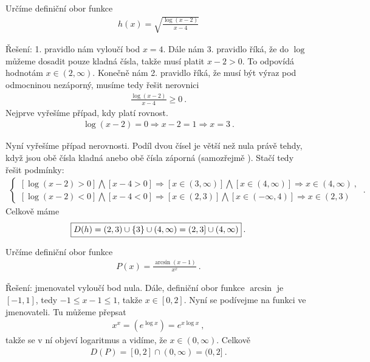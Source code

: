 \begin{example}
    Určíme definiční obor funkce \begin{align*}
        h(x) = \sqrt{ \frac{\log (x-2)}{x-4}}
    \end{align*}

    Řešení: 1. pravidlo nám vyloučí bod $x=4$. 
    Dále nám 3. pravidlo říká, že do $\log$ můžeme dosadit pouze kladná čísla, takže musí platit $x-2>0$. To odpovídá hodnotám $x \in (2, \infty)$. 
    Konečně nám 2. pravidlo říká, že musí být výraz pod odmocninou nezáporný, musíme tedy řešit nerovnici \begin{align*}
        \frac{\log (x-2)}{x-4} \geq 0 \:.
    \end{align*}
    Nejprve vyřešíme případ, kdy platí rovnost.
    \begin{align*}
        \log (x-2) = 0 \Longrightarrow x-2 = 1 \Longrightarrow x = 3 \:.
    \end{align*}
    
    Nyní vyřešíme případ nerovnosti. Podíl dvou čísel je větší než nula právě tehdy, když jsou obě čísla kladná anebo obě čísla záporná (samozřejmě ). Stačí tedy řešit podmínky:
    \begin{align*}
        \begin{cases}
            \left [\log (x-2) > 0 \right] \bigwedge \left[ x-4 > 0\right] \Longrightarrow [x \in (3,\infty)] \bigwedge [x \in (4, \infty)] \Longrightarrow x \in (4, \infty) \:, \\
            \left [\log (x-2) < 0 \right] \bigwedge \left[ x-4 < 0\right] \Longrightarrow [x \in (2,3)] \bigwedge [x \in (-\infty, 4)] \Longrightarrow x \in (2,3)
        \end{cases}
         \:.
    \end{align*}
    Celkově máme \begin{align*}
        \boxed{ D(h) = (2,3) \cup \left \lbrace 3 \right \rbrace \cup (4,\infty) = (2,3] \cup (4,\infty) } \:.
    \end{align*}
\end{example}

\begin{example}
    Určíme definiční obor funkce \begin{align*}
        P(x) = \frac{\arcsin (x-1)}{x^x} \:.
    \end{align*}

    Řešení: jmenovatel vyloučí bod nula. Dále, definiční obor funkce $\arcsin$ je $[-1,1]$, tedy $ -1 \leq x-1 \leq 1$, takže $x \in [0,2]$. 
    Nyní se podívejme na funkci ve jmenovateli. Tu můžeme přepsat \begin{align*}
        x^x = \left( e^{\log x} \right) = e^{x \log x} \:,
    \end{align*}
    takže se v ní objeví logaritmus a vidíme, že $x \in (0, \infty)$.
    Celkově \begin{align*}
        \boxed{ D(P) = [0,2] \cap (0, \infty) = (0,2] } \:.
    \end{align*}

\end{example}

